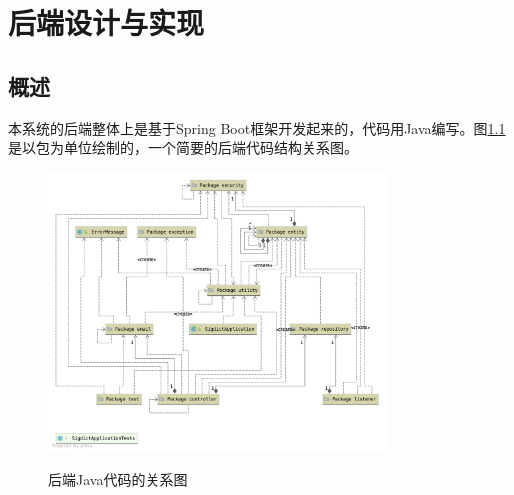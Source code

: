
\chapter{后端设计与实现}

\section{概述}

本系统的后端整体上是基于Spring Boot框架开发起来的，代码用Java编写。图\ref{fig:package}是以包为单位绘制的，一个简要的后端代码结构关系图。

\begin{figure}[!htb]
	\centering
	\includegraphics[width=0.8\textwidth]
	{figures/package.png}\\
	\caption{后端Java代码的关系图}
	\label{fig:package}
\end{figure}

